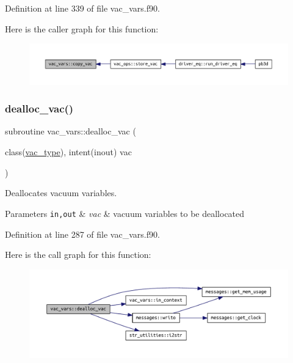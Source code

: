 Definition at line 339 of file vac\+\_\+vars.\+f90.

Here is the caller graph for this function\+:\nopagebreak
\begin{figure}[H]
\begin{center}
\leavevmode
\includegraphics[width=350pt]{namespacevac__vars_a8da702035bfcc208bd810258f9944f6a_icgraph}
\end{center}
\end{figure}
\mbox{\label{namespacevac__vars_aa6669ed787cf96e8f8fa665149bc83a3}} 
\subsubsection{\texorpdfstring{dealloc\+\_\+vac()}{dealloc\_vac()}}
{\footnotesize\ttfamily subroutine vac\+\_\+vars\+::dealloc\+\_\+vac (\begin{DoxyParamCaption}\item[{class(\hyperlink{structvac__vars_1_1vac__type}{vac\+\_\+type}), intent(inout)}]{vac }\end{DoxyParamCaption})}



Deallocates vacuum variables. 


\begin{DoxyParams}[1]{Parameters}
\mbox{\tt in,out}  & {\em vac} & vacuum variables to be deallocated \\
\hline
\end{DoxyParams}


Definition at line 287 of file vac\+\_\+vars.\+f90.

Here is the call graph for this function\+:\nopagebreak
\begin{figure}[H]
\begin{center}
\leavevmode
\includegraphics[width=350pt]{namespacevac__vars_aa6669ed787cf96e8f8fa665149bc83a3_cgraph}
\end{center}
\end{figure}
\mbox{\label{namespacevac__vars_af0fd2f819434bf7adc494753df4af19c}} 
